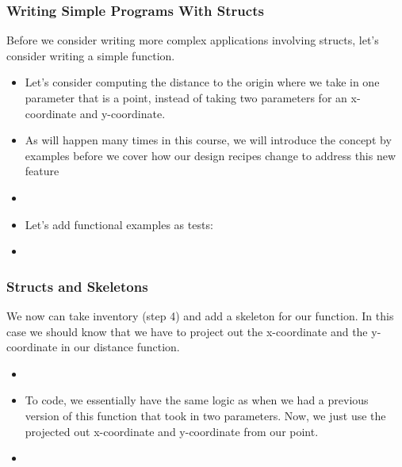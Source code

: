 \documentclass{beamer}
\begin{document}




\begin{frame}
  \frametitle{Writing Simple Programs With Structs}
  Before we consider writing more complex applications involving structs,
  let's consider writing a simple function.
  \begin{itemize}
  \item<2-> Let's consider computing the distance to the origin where we
    take in one parameter that is a point, instead of taking two parameters
    for an x-coordinate and y-coordinate.
  \item<3-> As will happen many times in this course, we will introduce
    the concept by examples before we cover how our design recipes change
    to address this new feature
  \item<4-> \distance
  \item<5->Let's add functional examples as tests:
  \item<6-> \distanceExamples
  \end{itemize}
\end{frame}

\begin{frame}
  \frametitle{Structs and Skeletons}
  We now can take inventory (step 4) and add a skeleton for our function.
  In this case we should know that we have to project out the x-coordinate
  and the y-coordinate in our distance function.
  \begin{itemize}
  \item<2-> \distanceSkeleton
  \item<3-> To code, we essentially have the same logic as when we had a previous
    version of this function that took in two parameters. Now, we just use
    the projected out x-coordinate and y-coordinate from our point.
  \item<4-> \distanceFinal
  \end{itemize}
\end{frame}
\end{document}
